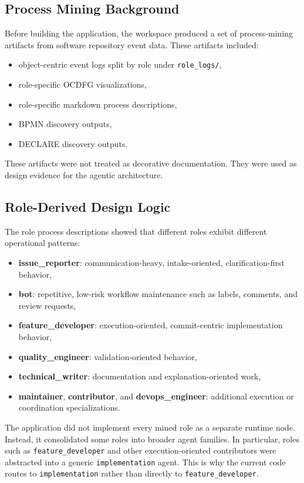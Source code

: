 \documentclass[11pt,a4paper]{article}
\begin{document}
\subsection{Process Mining Background}

Before building the application, the workspace produced a set of process-mining artifacts from software repository event data. These artifacts included:
\begin{itemize}
    \item object-centric event logs split by role under \texttt{role\_logs/},
    \item role-specific OCDFG visualizations,
    \item role-specific markdown process descriptions,
    \item BPMN discovery outputs,
    \item DECLARE discovery outputs.
\end{itemize}

These artifacts were not treated as decorative documentation. They were used as design evidence for the agentic architecture.

\subsection{Role-Derived Design Logic}

The role process descriptions showed that different roles exhibit different operational patterns:
\begin{itemize}
    \item \textbf{issue\_reporter}: communication-heavy, intake-oriented, clarification-first behavior,
    \item \textbf{bot}: repetitive, low-risk workflow maintenance such as labels, comments, and review requests,
    \item \textbf{feature\_developer}: execution-oriented, commit-centric implementation behavior,
    \item \textbf{quality\_engineer}: validation-oriented behavior,
    \item \textbf{technical\_writer}: documentation and explanation-oriented work,
    \item \textbf{maintainer}, \textbf{contributor}, and \textbf{devops\_engineer}: additional execution or coordination specializations.
\end{itemize}

The application did not implement every mined role as a separate runtime node. Instead, it consolidated some roles into broader agent families. In particular, roles such as \texttt{feature\_developer} and other execution-oriented contributors were abstracted into a generic \texttt{implementation} agent. This is why the current code routes to \texttt{implementation} rather than directly to \texttt{feature\_developer}.
\end{document}
